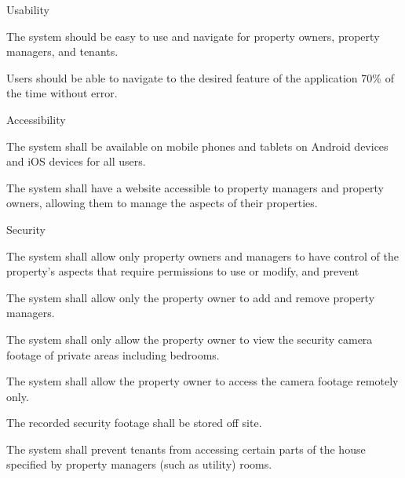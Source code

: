 \documentclass[letter,titlepage,oneside,english]{report}
\begin{document}
\begin{nfr}
\begin{nfr}
	\end{nfr}
\item
	Usability
	\begin{nfr}
	\item 
		The system should be easy to use and navigate for property owners, property managers, and tenants.
			\begin{nfr}
			\item 
				Users should be able to navigate to the desired feature of the application 70\% of the time without error.
			\end{nfr}
	\end{nfr}
\item 
	Accessibility
		\begin{nfr}
		\item 
			The system shall be available on mobile phones and tablets on Android devices and iOS devices for all users.
		\item 
			The system shall have a website accessible to property managers and property owners, allowing them to manage the aspects of their properties.
		\end{nfr}
\item 
	Security
		\begin{nfr}
		\item 
			The system shall allow only property owners and managers to have control of the property's aspects that require permissions to use or modify, and prevent 
		\item 
			The system shall allow only the property owner to add and remove property managers.
		\item 
			The system shall only allow the property owner to view the security camera footage of private areas including bedrooms.
			\begin{nfr}
			\item
			The system shall allow the property owner to access the camera footage remotely only.
			
			\item 
			The recorded security footage shall be stored off site.
			\end{nfr}
		\item 
			The system shall prevent tenants from accessing certain parts of the house specified by property managers (such as utility) rooms.
		\end{nfr}
\end{nfr}
\end{document}
